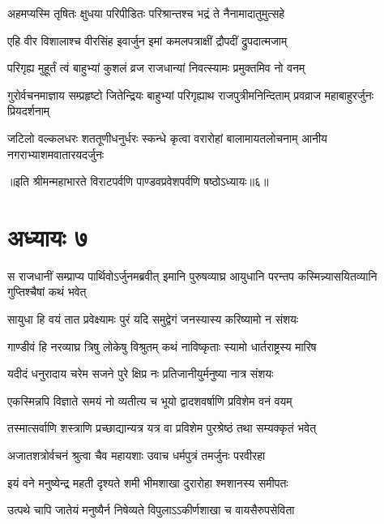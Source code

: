\twolineshloka
{अहमप्यस्मि तृषितः क्षुधया परिपीडितः}
{परिश्रान्तश्च भद्रं ते नैनामादातुमुत्सहे}




\twolineshloka
{एहि वीर विशालाश्च वीरसिंह इवार्जुन}
{इमां कमलपत्राक्षीं द्रौपदीं द्रुपदात्मजाम्}


\twolineshloka
{परिगृह्य मुहूर्तं त्वं बाहुभ्यां कुशलं व्रज}
{राजधान्यां निवत्स्यामः प्रमुक्तमिव नो वनम्}



\threelineshloka
{गुरोर्वचनमाज्ञाय सम्प्रहृष्टो जितेन्द्रियः}
{बाहुभ्यां परिगृह्याथ राजपुत्रीमनिन्दिताम्}
{प्रवव्राज महाबाहुरर्जुनः प्रियदर्शनाम्}


\threelineshloka
{जटिलो वल्कलधरः शततूणीधनुर्धरः}
{स्कन्धे कृत्वा वरारोहां बालामायतलोचनाम्}
{आनीय नगराभ्याशमवातारयदर्जुनः}


॥इति श्रीमन्महाभारते विराटपर्वणि पाण्डवप्रवेशपर्वणि षष्ठोऽध्यायः॥६॥

\chapter{अध्यायः ७}

\threelineshloka
{स राजधानीं सम्प्राप्य पार्थिवोऽर्जुनमब्रवीत्}
{इमानि पुरुषव्याघ्र आयुधानि परन्तप}
{कस्मिन्न्यासयितव्यानि गुप्तिश्चैषां कथं भवेत्}


\twolineshloka
{सायुधा हि वयं तात प्रवेक्ष्यामः पुरं यदि}
{समुद्वेगं जनस्यास्य करिष्यामो न संशयः}


\twolineshloka
{गाण्डीवं हि नरव्याघ्र त्रिषु लोकेषु विश्रुतम्}
{कथं नाविष्कृताः स्यामो धार्तराष्ट्रस्य मारिष}


\twolineshloka
{यदीदं धनुरादाय चरेम सजने पुरे}
{क्षिप्र नः प्रतिजानीयुर्मनुष्या नात्र संशयः}


\twolineshloka
{एकस्मिन्नपि विज्ञाते समयं नो व्यतीत्य च}
{भूयो द्वादशवर्षाणि प्रविशेम वनं वयम्}


\twolineshloka
{तस्मात्सर्वाणि शस्त्राणि प्रच्छाद्यान्यत्र यत्र वा}
{प्रविशेम पुरश्रेष्ठं तथा सम्यक्कृतं भवेत्}



\twolineshloka
{अजातशत्रोर्वचनं श्रुत्वा चैव महायशाः}
{उवाच धर्मपुत्रं तमर्जुनः परवीरहा}


\twolineshloka
{इयं वने मनुष्येन्द्र महती दृश्यते शमी}
{भीमशाखा दुरारोहा श्मशानस्य समीपतः}


\twolineshloka
{उत्पथे चापि जातेयं मनुष्यैर्न निषेव्यते}
{विपुलाऽऽकीर्णशाखा च वायसैरुपसेविता}


